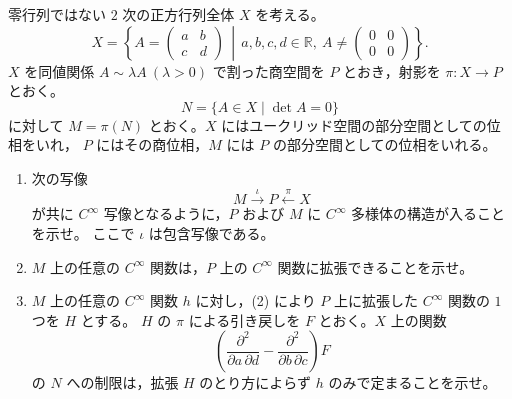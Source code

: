 \documentclass[12pt]{jlreq}
\newcommand{\R}{\mathbb{R}}
\begin{document}
零行列ではない \(2\) 次の正方行列全体 \(X\) を考える。
\[
  X=\left\{
    A=\begin{pmatrix}a&b\\ c&d\end{pmatrix}
    \,\middle|\,
    a,b,c,d\in\R,\ 
    A\ne \begin{pmatrix}0&0\\0&0\end{pmatrix}
  \right\}.
\]
\(X\) を同値関係 \(A\sim \lambda A\ (\lambda>0)\) で割った商空間を \(P\) とおき，射影を
\(\pi:X\to P\) とおく。
\[
  N=\{A\in X\mid \det A=0\}
\]
に対して \(M=\pi(N)\) とおく。\(X\) にはユークリッド空間の部分空間としての位相をいれ，
\(P\) にはその商位相，\(M\) には \(P\) の部分空間としての位相をいれる。

\begin{enumerate}
  \item 次の写像
  \[
    M\xrightarrow{\iota}P\xleftarrow{\pi}X
  \]
  が共に \(C^\infty\) 写像となるように，\(P\) および \(M\) に \(C^\infty\) 多様体の構造が入ることを示せ。
  ここで \(\iota\) は包含写像である。
  \item \(M\) 上の任意の \(C^\infty\) 関数は，\(P\) 上の \(C^\infty\) 関数に拡張できることを示せ。
  \item \(M\) 上の任意の \(C^\infty\) 関数 \(h\) に対し，(2) により \(P\) 上に拡張した \(C^\infty\) 関数の \(1\) つを \(H\) とする。
  \(H\) の \(\pi\) による引き戻しを \(F\) とおく。\(X\) 上の関数
  \[
    \left(\frac{\partial^2}{\partial a\,\partial d}
      -\frac{\partial^2}{\partial b\,\partial c}\right)F
  \]
  の \(N\) への制限は，拡張 \(H\) のとり方によらず \(h\) のみで定まることを示せ。
\end{enumerate}
\end{document}
